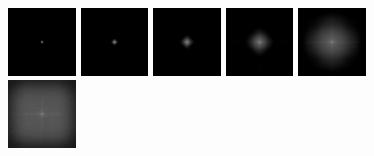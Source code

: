 \begin{figure}[!h]
\includegraphics[width=0.16\textwidth]{img/ch6/copper/gfft1.png}
\includegraphics[width=0.16\textwidth]{img/ch6/copper/gfft2.png}
\includegraphics[width=0.16\textwidth]{img/ch6/copper/gfft3.png}
\includegraphics[width=0.16\textwidth]{img/ch6/copper/gfft4.png}
\includegraphics[width=0.16\textwidth]{img/ch6/copper/gfft5.png}
\includegraphics[width=0.16\textwidth]{img/ch6/copper/gfft6.png}


\end{figure}
